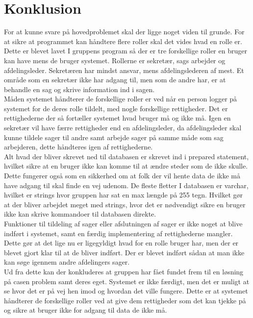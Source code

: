 \chapter{Konklusion}
For at kunne svare på hovedproblemet skal der ligge noget viden til grunde. For at sikre at programmet kan håndtere flere roller skal det vides hvad en rolle er. Dette er blevet lavet I gruppens program så der er tre forskellige roller en bruger kan have mens de bruger systemet. Rollerne er sekretær, sags arbejder og afdelingsleder. Sekretæren har mindst ansvar, mens afdelingslederen af mest. Et område som en sekretær ikke har adgang til, men som de andre har, er at behandle en sag og skrive information ind i sagen. \\
Måden systemet håndterer de forskellige roller er ved når en person logger på systemet for de deres rolle tildelt, med nogle forskellige rettigheder. Det er rettighederne der så fortæller systemet hvad bruger må og ikke må. Igen en sekretær vil have færre rettigheder end en afdelingsleder, da afdelingsleder skal kunne tildele sager til andre samt arbejde sager på samme måde som sag arbejderen, dette håndteres igen af rettighederne. \\
Alt hvad der bliver skrevet ned til databasen er skrevet ind i prepared statement, hvilket sikre at en bruger ikke kan komme til at ændre steder som de ikke skulle. Dette fungerer også som en sikkerhed om at folk der vil hente data de ikke må have adgang til skal finde en vej udenom. De fleste fletter I databasen er varchar, hvilket er strings hvor gruppen har sat en max længde på 255 tegn. Hvilket gør at der bliver arbejdet meget med strings, hvor det er nødvendigt sikre en bruger ikke kan skrive kommandoer til databasen direkte. \\
Funktioner til tildeling af sager eller afslutningen af sager er ikke noget at blive indført i systemet, samt en færdig implementering af rettighederne mangler. Dette gør at det lige nu er ligegyldigt hvad for en rolle bruger har, men der er blevet gjort klar til at de bliver indført. Der er blevet indført sådan at man ikke kan søge igennem andre afdelingers sager.   \\
Ud fra dette kan der konkluderes at gruppen har fået fundet frem til en løsning på casen problem samt deres eget. Systemet er ikke færdigt, men det er muligt at se hvor det er på vej hen imod og hvordan det ville fungere. Dette er at systemet håndterer de forskellige roller ved at give dem rettigheder som det kan tjekke på og sikre at bruger ikke for adgang til data de ikke må. \\
